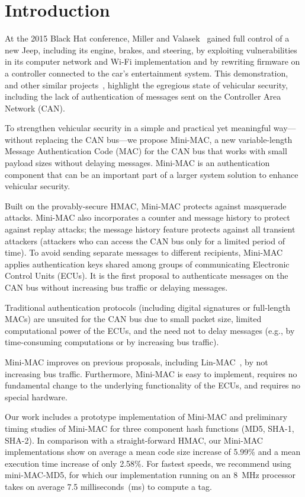 \section{Introduction}
\label{intro}

At the 2015 Black Hat conference, Miller and Valasek~\cite{blackhat} gained full control of a new Jeep,
including its engine, brakes, and steering, by exploiting vulnerabilities in its
computer network and Wi-Fi implementation and by rewriting firmware on a controller connected to the car's entertainment system.
This demonstration, and other similar 
projects~\cite{Rouf2010,Koscher-2010,Checkoway-2011,Woo-14,C2X}, 
highlight the egregious state of vehicular security, including the lack of 
authentication of messages sent on the Controller Area Network (CAN).   

To strengthen vehicular security in a simple and practical 
yet meaningful way---without replacing the CAN bus---we propose Mini-MAC, 
a new variable-length Message Authentication Code (MAC)
for the CAN bus that works with small payload sizes without delaying messages.  
Mini-MAC is an authentication component that can be an important part of a larger system solution
to enhance vehicular security.

Built on the provably-secure HMAC, Mini-MAC protects against masquerade attacks.  
Mini-MAC also incorporates a counter and message history to protect against replay attacks;
the message history feature protects against all transient attackers (attackers
who can access the CAN bus only for a limited period of time).
To avoid sending separate messages to different recipients, Mini-MAC applies authentication keys
shared among groups of communicating Electronic Control Units (ECUs).
It is the first proposal to authenticate messages on the CAN bus without increasing bus traffic
or delaying messages. 

Traditional authentication protocols (including digital signatures or full-length MACs) are unsuited for the CAN bus due to
small packet size, limited computational power of the ECUs,
and the need not to delay messages (e.g., by time-consuming computations or by
increasing bus traffic).   

Mini-MAC improves on previous proposals, including Lin-MAC~\cite{Lin-MAC}, by not increasing bus traffic.
Furthermore, Mini-MAC is easy to implement,
requires no fundamental change to the underlying functionality of the ECUs, and 
requires no special hardware.

Our work includes a prototype implementation of Mini-MAC and preliminary timing studies 
of Mini-MAC for three component hash functions (MD5, SHA-1, SHA-2).  
In comparison with a straight-forward HMAC, our Mini-MAC implementations show on average
a mean code size increase of 5.99\% and 
a mean execution time increase of only 2.58\%.
For fastest speeds, we recommend using mini-MAC-MD5, for which our implementation 
running on an 8~MHz processor takes on average 
7.5 milliseconds~(ms) to compute a tag.

